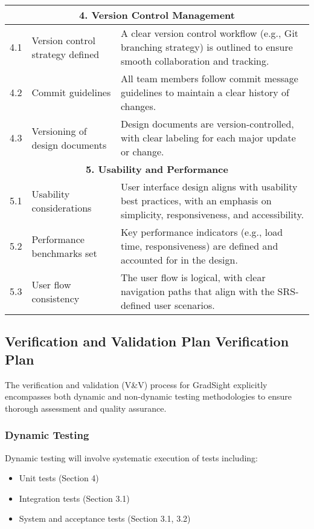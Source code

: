 \documentclass[12pt, titlepage]{article}
\begin{document}
\begin{longtable}{|p{1cm}|p{6cm}|p{8cm}|}
\multicolumn{3}{|c|}{\textbf{4. Version Control Management}} \\
\hline
4.1 & Version control strategy defined & A clear version control workflow (e.g., Git branching strategy) is outlined to ensure smooth collaboration and tracking. \\
\hline
4.2 & Commit guidelines & All team members follow commit message guidelines to maintain a clear history of changes. \\
\hline
4.3 & Versioning of design documents & Design documents are version-controlled, with clear labeling for each major update or change. \\
\hline

\multicolumn{3}{|c|}{\textbf{5. Usability and Performance}} \\
\hline
5.1 & Usability considerations & User interface design aligns with usability best practices, with an emphasis on simplicity, responsiveness, and accessibility. \\
\hline
5.2 & Performance benchmarks set & Key performance indicators (e.g., load time, responsiveness) are defined and accounted for in the design. \\
\hline
5.3 & User flow consistency & The user flow is logical, with clear navigation paths that align with the SRS-defined user scenarios. \\
\hline

\end{longtable}


\subsection{Verification and Validation Plan Verification Plan}

The verification and validation (V\&V) process for GradSight explicitly encompasses both dynamic and non-dynamic testing methodologies to ensure thorough assessment and quality assurance.

\subsubsection*{Dynamic Testing}
Dynamic testing will involve systematic execution of tests including:
\begin{itemize}
    \item Unit tests (Section 4)
    \item Integration tests (Section 3.1)
    \item System and acceptance tests (Section 3.1, 3.2)
\end{itemize}
\end{document}
